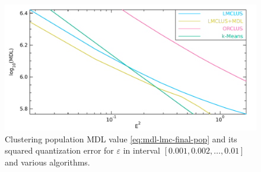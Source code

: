 \begin{figure}[ht]
\centering
\includegraphics[scale=0.3]{img/toterrs2-mdl-si.pdf}
\caption{Clustering population MDL value \eqref{eq:mdl-lmc-final-pop} and its squared quantization error for $\varepsilon$ in interval $\left[0.001, 0.002, \dots, 0.01 \right]$ and various algorithms.}
\label{fig:mdl-error-pop}
\end{figure}


